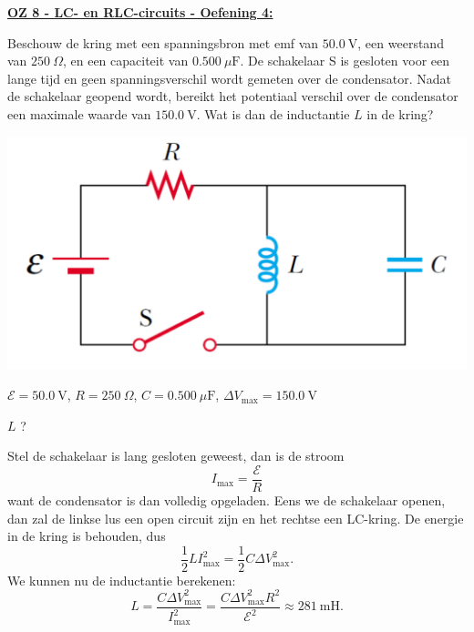 \textbf{\underline{OZ 8 - LC- en  RLC-circuits - Oefening 4:}}
\vspace{0.5cm}

Beschouw de kring met een spanningsbron met emf van $50.0 \ \text{V}$, een weerstand van $250 \ \Omega$, en een capaciteit van $0.500 \ \mu \text{F}$. De schakelaar S is gesloten voor een lange tijd en geen spanningsverschil wordt gemeten over de condensator. Nadat de schakelaar geopend wordt, bereikt het potentiaal verschil over de condensator een maximale waarde van $150.0 \ \text{V}$. Wat is dan de inductantie $L$ in de kring?

\begin{center}
    \includegraphics[scale = 0.3]{oz08/resources/Oz8Oef4.png}
\end{center}
    
\begin{description}[labelwidth=1.5cm, leftmargin=!]
    \item[Geg. :]  $\mathcal{E} = 50.0 \ \text{V}$, $R = 250 \ \Omega$, $C = 0.500 \ \mu \text{F}$, $\Delta V_{\text{max}} = 150.0 \ \text{V}$
    \item[Gevr. :] $L$ ?
    \item[Opl. :] 
        Stel de schakelaar is lang gesloten geweest, dan is de stroom 
        \begin{equation*}
            I_{\text{max}} = \frac{\mathcal{E}}{R}
        \end{equation*}
        want de condensator is dan volledig opgeladen. Eens we de schakelaar openen, dan zal de linkse lus een open circuit zijn en het rechtse een LC-kring. De energie in de kring is behouden, dus
        \begin{equation*}
            \frac{1}{2}LI_{\text{max}}^2 = \frac{1}{2}C\Delta V_{\text{max}}^2. 
        \end{equation*}
        We kunnen nu de inductantie berekenen:
        \begin{equation*}
            L = \frac{C\Delta V_{\text{max}}^2}{I_{\text{max}}^2} = \frac{C\Delta V_{\text{max}}^2R^2}{\mathcal{E}^2} \approx 281 \ \text{mH}.
        \end{equation*}

\end{description}

\vspace{1cm}